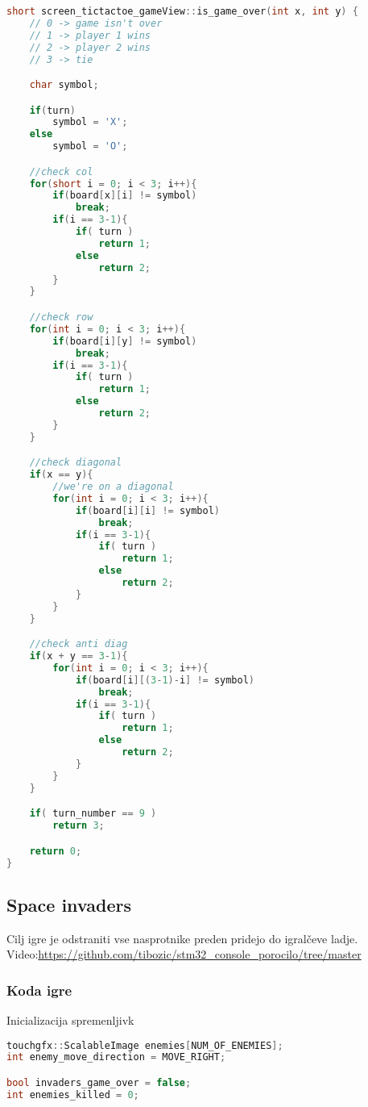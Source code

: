 \documentclass{article}
\begin{document}
\begin{lstlisting}[language=c++]
short screen_tictactoe_gameView::is_game_over(int x, int y) {
	// 0 -> game isn't over
	// 1 -> player 1 wins
	// 2 -> player 2 wins
	// 3 -> tie

	char symbol;

	if(turn)
		symbol = 'X';
	else
		symbol = 'O';

    //check col
    for(short i = 0; i < 3; i++){
        if(board[x][i] != symbol)
            break;
        if(i == 3-1){
            if( turn )
            	return 1;
            else
            	return 2;
        }
    }

    //check row
    for(int i = 0; i < 3; i++){
        if(board[i][y] != symbol)
            break;
        if(i == 3-1){
            if( turn )
            	return 1;
            else
            	return 2;
        }
    }

    //check diagonal
    if(x == y){
        //we're on a diagonal
        for(int i = 0; i < 3; i++){
            if(board[i][i] != symbol)
                break;
            if(i == 3-1){
                if( turn )
                	return 1;
                else
                	return 2;
            }
        }
    }

    //check anti diag
    if(x + y == 3-1){
        for(int i = 0; i < 3; i++){
            if(board[i][(3-1)-i] != symbol)
                break;
            if(i == 3-1){
                if( turn )
                	return 1;
                else
                	return 2;
            }
        }
    }

	if( turn_number == 9 )
		return 3;

	return 0;
}
\end{lstlisting}

\subsection{Space invaders}
\noindent
Cilj igre je odstraniti vse nasprotnike preden pridejo do
igral\v{c}eve ladje. \\
Video:\href{https://github.com/tibozic/stm32_console_porocilo/tree/master}{https://github.com/tibozic/stm32\_console\_porocilo/tree/master}

\subsubsection{Koda igre}
\noindent
Inicializacija spremenljivk
\begin{lstlisting}[language=c++]
touchgfx::ScalableImage enemies[NUM_OF_ENEMIES];
int enemy_move_direction = MOVE_RIGHT;

bool invaders_game_over = false;
int enemies_killed = 0;
\end{lstlisting}
\end{document}
